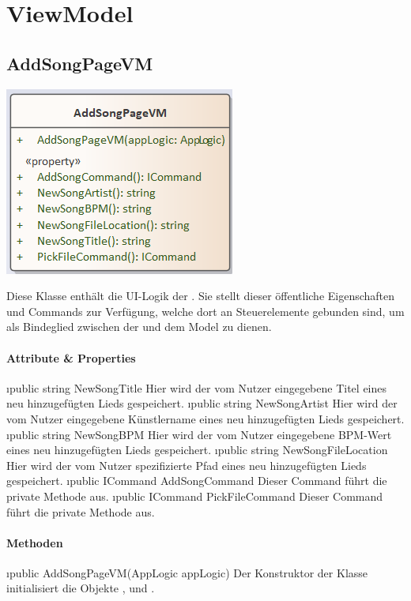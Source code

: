 \documentclass[../entwurf.tex]{subfiles}
\begin{document}
\section{ViewModel}
\subsection{AddSongPageVM}
\begin{minipage}{0.45\textwidth}
\includegraphics[scale=0.75]{../graphics/vm_klassen/AddSongPageVM.png}
\end{minipage}
\begin{minipage}{0.55\textwidth}
Diese Klasse enthält die UI-Logik der . Sie stellt dieser öffentliche Eigenschaften und Commands zur Verfügung, welche dort an Steuerelemente gebunden sind, um als Bindeglied zwischen der  und dem Model zu dienen.
\end{minipage}
\paragraph{Attribute \& Properties}
\begin{itemize}
	\i{public string NewSongTitle} Hier wird der vom Nutzer eingegebene Titel eines neu hinzugefügten Lieds gespeichert.
	\i{public string NewSongArtist} Hier wird der vom Nutzer eingegebene Künstlername eines neu hinzugefügten Lieds gespeichert.
	\i{public string NewSongBPM} Hier wird der vom Nutzer eingegebene BPM-Wert eines neu hinzugefügten Lieds gespeichert.
	\i{public string NewSongFileLocation} Hier wird der vom Nutzer spezifizierte Pfad eines neu hinzugefügten Lieds gespeichert.
	\i{public ICommand AddSongCommand} Dieser Command führt die private Methode  aus.
	\i{public ICommand PickFileCommand} Dieser Command führt die private Methode  aus.
\end{itemize}
\paragraph{Methoden}
\begin{itemize}
	\i{public AddSongPageVM(AppLogic appLogic)} Der Konstruktor der Klasse initialisiert die Objekte ,  und .
\end{itemize}
\end{document}
